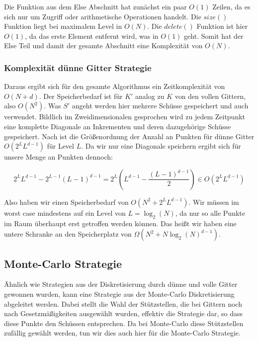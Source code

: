 \documentclass[a4paper,12pt]{llncs}
\numberwithin{equation}{section}
\begin{document}
Die Funktion aus dem Else Abschnitt hat zunächst ein paar $O(1)$ Zeilen, da es sich nur um Zugriff oder arithmetische Operationen handelt. Die $size()$ Funktion liegt bei maximalem Level in $O(N)$. Die $delete()$ Funktion ist hier $O(1)$, da das erste Element entfernt wird, was in $O(1)$ geht. Somit hat der Else Teil und damit der gesamte Abschnitt eine Komplexität von $O(N)$.

\subsubsection{Komplexität dünne Gitter Strategie}

Daraus ergibt sich für den gesamte Algorithmus ein Zeitkomplexität von $O(N+d)$. Der Speicherbedarf ist für $K'$ analog zu $K$ von den vollen Gittern, also $O(N^2)$. Was $S'$ angeht werden hier mehrere Schüsse gespeichert und auch verwendet. Bildlich im Zweidimensionalen gesprochen wird zu jedem Zeitpunkt eine komplette Diagonale an Inkrementen und deren dazugehörige Schüsse gespeichert. Nach \cite{GG08} ist die Größenordnung der Anzahl an Punkten für dünne Gitter $O(2^LL^{d-1})$ für Level $L$. Da wir nur eine Diagonale speichern ergibt sich für unsere Menge an Punkten dennoch:

\begin{equation}
2^LL^{d-1}-2^{L-1}(L-1)^{d-1}=2^L\left(L^{d-1}-\frac{(L-1)^{d-1}}{2}\right)\in O(2^LL^{d-1})
\end{equation}

Also haben wir einen Speicherbedarf von $O(N^2+2^LL^{d-1})$. Wir müssen im worst case mindestens auf ein Level von $L=\log_2(N)$, da nur so alle Punkte im Raum überhaupt erst getroffen werden können. Das heißt wir haben eine untere Schranke an den Speicherplatz von $\Omega(N^2+N\log_2(N)^{d-1})$.


\subsection{Monte-Carlo Strategie}

Ähnlich wie Strategien aus der Diskretisierung durch dünne und volle Gitter gewonnen wurden, kann eine Strategie aus der Monte-Carlo Diskretisierung abgeleitet werden. Dabei stellt die Wahl der Stützstellen, die bei Gittern noch nach Gesetzmäßigkeiten ausgewählt wurden, effektiv die Strategie dar, so dass diese Punkte den Schüssen entsprechen. Da bei Monte-Carlo diese Stützstellen zufällig gewählt werden, tun wir dies auch hier für die Monte-Carlo Strategie. 
\end{document}
